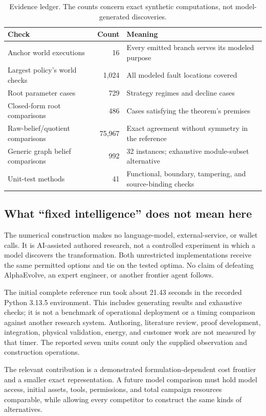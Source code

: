 \documentclass[11pt,letterpaper]{article}
\theoremstyle{remark}\newtheorem{remark}{Remark}[section]
\begin{document}
\begin{table}[htbp]\centering\small
\caption{Evidence ledger. The counts concern exact synthetic computations, not model-generated discoveries.}\label{tab:coverage}
\begin{tabularx}{\linewidth}{@{}YrY@{}}\toprule
Check & Count & Meaning\\\midrule
Anchor world executions & 16 & Every emitted branch serves its modeled purpose\\
Largest policy's world checks & 1,024 & All modeled fault locations covered\\
Root parameter cases & 729 & Strategy regimes and decline cases\\
Closed-form root comparisons & 486 & Cases satisfying the theorem's premises\\
Raw-belief/quotient comparisons & 75,967 & Exact agreement without symmetry in the reference\\
Generic graph belief comparisons & 992 & 32 instances; exhaustive module-subset alternative\\
Unit-test methods & 41 & Functional, boundary, tampering, and source-binding checks\\\bottomrule
\end{tabularx}
\end{table}

\subsection{What ``fixed intelligence'' does not mean here}
The numerical construction makes no language-model, external-service, or wallet calls. It is AI-assisted authored research, not a controlled experiment in which a model discovers the transformation. Both unrestricted implementations receive the same permitted options and tie on the tested optima. No claim of defeating AlphaEvolve, an expert engineer, or another frontier agent follows.

The initial complete reference run took about 21.43 seconds in the recorded Python 3.13.5 environment. This includes generating results and exhaustive checks; it is not a benchmark of operational deployment or a timing comparison against another research system. Authoring, literature review, proof development, integration, physical validation, energy, and customer work are not measured by that timer. The reported seven units count only the supplied observation and construction operations.

The relevant contribution is a demonstrated formulation-dependent cost frontier and a smaller exact representation. A future model comparison must hold model access, initial assets, tools, permissions, and total campaign resources comparable, while allowing every competitor to construct the same kinds of alternatives.
\end{document}
